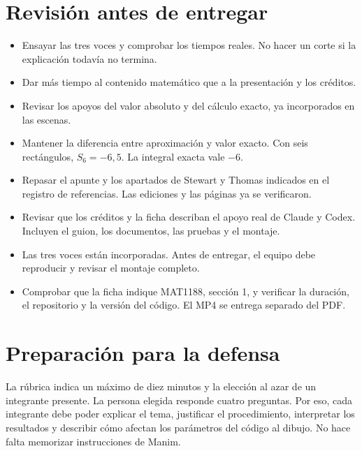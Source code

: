 \documentclass[11pt,a4paper]{article}
\begin{document}
\section*{Revisión antes de entregar}
\begin{itemize}[leftmargin=1.5em,itemsep=4pt]
\item Ensayar las tres voces y comprobar los tiempos reales. No hacer un corte si la explicación todavía no termina.
\item Dar más tiempo al contenido matemático que a la presentación y los créditos.
\item Revisar los apoyos del valor absoluto y del cálculo exacto, ya incorporados en las escenas.
\item Mantener la diferencia entre aproximación y valor exacto. Con seis rectángulos, $S_6=-6{,}5$. La integral exacta vale $-6$.
\item Repasar el apunte y los apartados de Stewart y Thomas indicados en el registro de referencias. Las ediciones y las páginas ya se verificaron.
\item Revisar que los créditos y la ficha describan el apoyo real de Claude y Codex. Incluyen el guion, los documentos, las pruebas y el montaje.
\item Las tres voces están incorporadas. Antes de entregar, el equipo debe reproducir y revisar el montaje completo.
\item Comprobar que la ficha indique MAT1188, sección 1, y verificar la duración, el repositorio y la versión del código. El MP4 se entrega separado del PDF.
\end{itemize}

\section*{Preparación para la defensa}
La rúbrica indica un máximo de diez minutos y la elección al azar de un integrante presente. La persona elegida responde cuatro preguntas. Por eso, cada integrante debe poder explicar el tema, justificar el procedimiento, interpretar los resultados y describir cómo afectan los parámetros del código al dibujo. No hace falta memorizar instrucciones de Manim.
\end{document}
